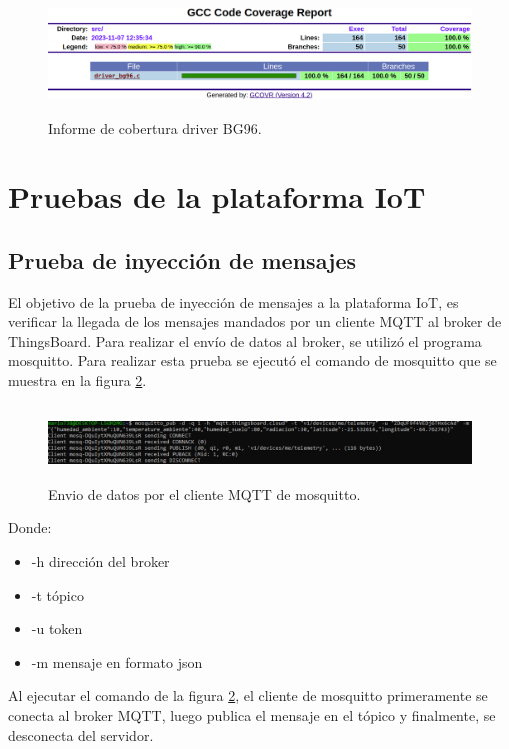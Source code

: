 \begin{figure}[h!]
    \centering
      \includegraphics[width=\linewidth, height=3.2cm]{./Figures/cobertura_bg96_2.png}
    \caption{Informe de cobertura driver BG96.}
      \label{fig:Cobertura BG96}
\end{figure}

\section{Pruebas de la plataforma IoT}
\subsection{Prueba de inyección de mensajes}
El objetivo de la prueba de inyección de mensajes a la plataforma IoT, es verificar la llegada de los mensajes mandados por un cliente MQTT al broker de ThingsBoard.
Para realizar el envío de datos al broker, se utilizó el programa mosquitto. Para realizar esta prueba se ejecutó el comando de mosquitto que se muestra en la figura \ref{fig:mosquitto pub}.

\begin{figure}[h!]
  \centering
    \includegraphics[width=\linewidth, height=2cm]{./Figures/mosquito_enviodatos.png}
  \caption{Envio de datos por el cliente MQTT de mosquitto.}
    \label{fig:mosquitto pub}
\end{figure}

Donde:
\begin{itemize}
  \item -h dirección del broker
  \item -t tópico 
  \item -u token
  \item -m mensaje en formato json
\end{itemize}

Al ejecutar el comando de la figura \ref{fig:mosquitto pub}, el cliente de mosquitto primeramente se conecta al broker MQTT, luego publica el mensaje en el tópico y finalmente, se desconecta del servidor.

